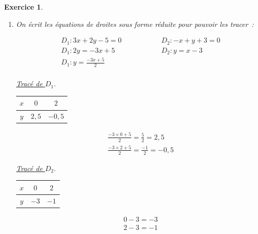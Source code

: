 \documentclass[10pt]{article}
\newtheorem{exo}{Exercice}
\begin{document}
\begin{exo}

\begin{enumerate}
\item On écrit les équations de droites sous forme réduite pour pouvoir les tracer~:

\begin{alignat*}{2}
&D_1:3x+2y-5=0\qquad\qquad &&D_2:-x+y+3=0\\
&D_1:2y=-3x+5\qquad\qquad &&D_2:y=x-3\\
&D_1:y=\frac{-3x+5}{2} && \\
\end{alignat*}

\setlength{\columnseprule}{0.5pt}
\begin{multicols}{2}

\underline{Tracé de $D_1.$}

\medskip

\begin{center}
 \begin{tabular}{|c|c|c|}\hline
$x$& $0$ &$2$ \\ \hline 
$y$&$2,5$ &$-0,5$  \\ \hline
\end{tabular}
\end{center}


\begin{align*}&\frac{-3\times 0+5}{2}=\frac{5}{2}=2,5\\
&\frac{-3\times 2+5}{2}=\frac{-1}{2}=-0,5
\end{align*}

\columnbreak

\underline{Tracé de $D_2.$}

\medskip
\begin{center}
 \begin{tabular}{|c|c|c|}\hline
$x$& $0$ &$2$ \\ \hline 
$y$&$-3$ &$-1$  \\ \hline
\end{tabular}
\end{center}


\begin{align*}&0-3=-3\\
&2-3=-1
\end{align*}

\end{multicols}



\end{enumerate}
\end{exo}
\end{document}
